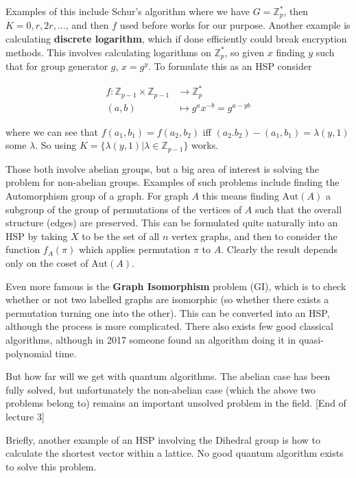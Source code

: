 \documentclass{article}
\theoremstyle{definition}
\begin{document}
Examples of this include Schur's algorithm where we have $G = \mathbb{Z}_p^*$,
then $K = {0, r, 2r, \dots}$, and then $f$ used before works for our purpose.
Another example is calculating \textbf{discrete logarithm}, which if done
efficiently could break encryption methods. This involves calculating logarithms
on $\mathbb{Z}_p^*$, so given $x$ finding $y$ such that for group generator $g$,
$x = g^y$. To formulate this as an HSP consider

\begin{align*}
  f : \mathbb{Z}_{p - 1} \times \mathbb{Z}_{p - 1} &\to \mathbb{Z}_p^* \\
  (a, b) &\mapsto g^ax^{-b} = g^{a - yb}
\end{align*}

where we can see that $f(a_1, b_1) = f(a_2, b_2)$ iff $(a_2. b_2) - (a_1, b_1) =
\lambda (y, 1)$ some $\lambda$. So using $K = \{\lambda (y, 1) | \lambda \in
\mathbb{Z}_{p - 1}\}$ works.

Those both involve abelian groups, but a big area of interest is solving
the problem for non-abelian groups. Examples of such problems include finding
the Automorphism group of a graph. For graph $A$ this means finding
$\text{Aut}(A)$ a subgroup of the group of permutations of the vertices of $A$
such that the overall structure (edges) are preserved. This can be formulated
quite naturally into an HSP by taking $X$ to be the set of all $n$ vertex
graphs, and then to consider the function $f_A(\pi)$ which applies permutation
$\pi$ to $A$. Clearly the result depends only on the coset of $\text{Aut}(A)$.

Even more famous is the \textbf{Graph Isomorphism} problem (GI), which is to
check whether or not two labelled graphs are isomorphic (so whether there exists
a permutation turning one into the other). This can be converted into an HSP,
although the process is more complicated. There also exists few good classical
algorithms, although in 2017 someone found an algorithm doing it in
quasi-polynomial time. 

But how far will we get with quantum algorithms. The abelian case has been fully
solved, but unfortunately the non-abelian case (which the above two problems
belong to) remains an important unsolved problem in the field. [End of lecture 3]

Briefly, another example of an HSP involving the Dihedral group is how to
calculate the shortest vector within a lattice. No good quantum algorithm exists
to solve this problem.
\end{document}
